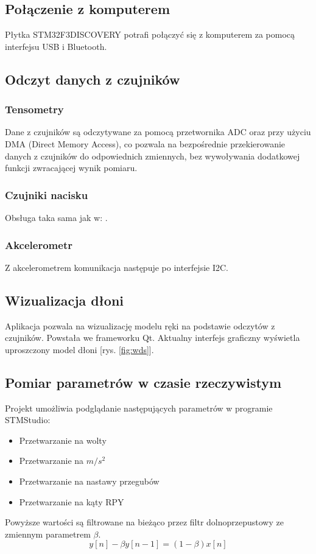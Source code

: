 \documentclass[12pt,a4paper]{article}
\begin{document}
\subsection{Połączenie z komputerem}
Płytka STM32F3DISCOVERY potrafi połączyć się z komputerem za pomocą interfejsu USB i Bluetooth.

\subsection{Odczyt danych z czujników}
\subsubsection{Tensometry} \label{tensometry}
Dane z czujników są odczytywane za pomocą przetwornika ADC oraz przy użyciu DMA (Direct Memory Access), co pozwala na bezpośrednie przekierowanie danych z czujników do odpowiednich zmiennych, bez wywoływania dodatkowej funkcji zwracającej wynik pomiaru.
\subsubsection{Czujniki nacisku}
Obsługa taka sama jak w: .
\subsubsection{Akcelerometr}
Z akcelerometrem komunikacja następuje po interfejsie I2C.



\subsection{Wizualizacja dłoni}
Aplikacja pozwala na wizualizację modelu ręki na podstawie odczytów z czujników. Powstała we frameworku Qt. Aktualny interfejs graficzny wyświetla uproszczony model dłoni [rys. \ref{fig:wds}].
\subsection{Pomiar parametrów w czasie rzeczywistym}
Projekt umożliwia podglądanie następujących parametrów w programie STMStudio:
\begin{itemize}
\item Przetwarzanie na wolty
\item Przetwarzanie na $m/s^2$
\item Przetwarzanie na nastawy przegubów
\item Przetwarzanie na kąty RPY
\end{itemize}
Powyższe wartości są filtrowane na bieżąco przez filtr dolnoprzepustowy ze zmiennym parametrem $\beta$.
\begin{equation}
y[n] - \beta y[n-1] = (1-\beta)x[n]
\end{equation}
\end{document}
